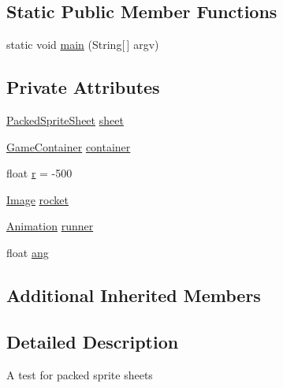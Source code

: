\subsection*{Static Public Member Functions}
\begin{DoxyCompactItemize}
\item 
static void \mbox{\hyperlink{classorg_1_1newdawn_1_1slick_1_1tests_1_1_packed_sheet_test_a03199255b68c4a482981e6b097f208e6}{main}} (String\mbox{[}$\,$\mbox{]} argv)
\end{DoxyCompactItemize}
\subsection*{Private Attributes}
\begin{DoxyCompactItemize}
\item 
\mbox{\hyperlink{classorg_1_1newdawn_1_1slick_1_1_packed_sprite_sheet}{Packed\+Sprite\+Sheet}} \mbox{\hyperlink{classorg_1_1newdawn_1_1slick_1_1tests_1_1_packed_sheet_test_a13e3e749653c1bb88460f1e4438af2eb}{sheet}}
\item 
\mbox{\hyperlink{classorg_1_1newdawn_1_1slick_1_1_game_container}{Game\+Container}} \mbox{\hyperlink{classorg_1_1newdawn_1_1slick_1_1tests_1_1_packed_sheet_test_a627ba2a3381f2182796b91ede952fa0e}{container}}
\item 
float \mbox{\hyperlink{classorg_1_1newdawn_1_1slick_1_1tests_1_1_packed_sheet_test_a05f9b0080fb3be5b16ca385be62b313e}{r}} = -\/500
\item 
\mbox{\hyperlink{classorg_1_1newdawn_1_1slick_1_1_image}{Image}} \mbox{\hyperlink{classorg_1_1newdawn_1_1slick_1_1tests_1_1_packed_sheet_test_acc91649e25d72cfdc20d673c77b14dcb}{rocket}}
\item 
\mbox{\hyperlink{classorg_1_1newdawn_1_1slick_1_1_animation}{Animation}} \mbox{\hyperlink{classorg_1_1newdawn_1_1slick_1_1tests_1_1_packed_sheet_test_af810b2c6a2b18bbc3a0309491b3fd358}{runner}}
\item 
float \mbox{\hyperlink{classorg_1_1newdawn_1_1slick_1_1tests_1_1_packed_sheet_test_a0be222259a5aa1c22ffe9fa2f06d207d}{ang}}
\end{DoxyCompactItemize}
\subsection*{Additional Inherited Members}


\subsection{Detailed Description}
A test for packed sprite sheets


